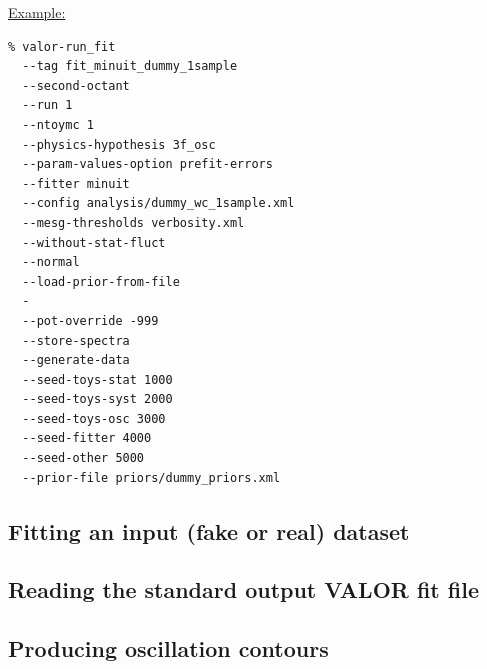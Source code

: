 \underline{Example:}
\begin{verbatim}
% valor-run_fit 
  --tag fit_minuit_dummy_1sample 
  --second-octant 
  --run 1 
  --ntoymc 1 
  --physics-hypothesis 3f_osc 
  --param-values-option prefit-errors 
  --fitter minuit 
  --config analysis/dummy_wc_1sample.xml 
  --mesg-thresholds verbosity.xml 
  --without-stat-fluct 
  --normal 
  --load-prior-from-file 
  - 
  --pot-override -999 
  --store-spectra 
  --generate-data 
  --seed-toys-stat 1000 
  --seed-toys-syst 2000 
  --seed-toys-osc 3000 
  --seed-fitter 4000 
  --seed-other 5000 
  --prior-file priors/dummy_priors.xml
\end{verbatim}


\subsection{
 Fitting an input (fake or real) dataset
}

\subsection{
 Reading the standard output VALOR fit file
}

\subsection{
 Producing oscillation contours
}
